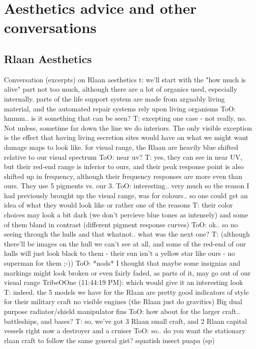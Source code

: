 \section{Aesthetics advice and other conversations}
\subsection{Rlaan Aesthetics}
Conversation (excerpts) on Rlaan aesthetics
t: we'll start with the "how much is alive" part
not too much, although there are a lot of organics used, especially internally.
parts of the life support system are made from arguably living material, and the automated repair systems rely upon living organisms
ToO: hmmm.. is it something that can be seen?
T: excepting one case - not really, no. Not unless, sometime far down the line we do interiors. The only visible exception is the effect that having living secretion sites would have on what we might want damage maps to look like.
for visual range, the Rlaan are heavily blue shifted relative to our visual spectrum
ToO: near uv?
T: yes, they can see in near UV, but their red-end range is inferior to ours, and their peak response point is also shifted up in frequency, although their frequency responses are more even than ours. They use 5 pigments vs. our 3.
ToO: interesting.. very much so
the reason I had previously brought up the visual range, was for colours.. so one could get an idea of what they would look like
or rather one of the reasons
T: their color choices may look a bit dark (we don't percieve blue tones as intensely) and some of them bland in contrast (different pigment response curves)
ToO: ok.. so no seeing through the hulls and that whatnot.. what was the next one?
T: (although there'll be images on the hull we can't see at all, and some of the red-end of our hulls will just look black to them - their sun isn't a yellow star like ours - no superman for them ;-))
ToO: *nods* I thought that maybe some insignias and markings might look broken or even fairly faded, as parts of it, may go out of our visual range
TribeOOne (11:44:19 PM): which would give it an interesting look
T: indeed.
the 5 models we have for the Rlaan are pretty good indicators of style for their military craft
 no visible engines (the Rlaan just do gravitics)
 Big dual purpose radiator/shield manipulator fins
ToO: how about for the larger craft.. battleships, and bases?
T: so, we've got 3 Rlaan small craft, and 2 Rlaan capital vessels right now
 a destroyer and a cruiser
ToO: so.. do you want the stationary rlaan craft to follow the same general gist? squatish insect puapa (sp) 
